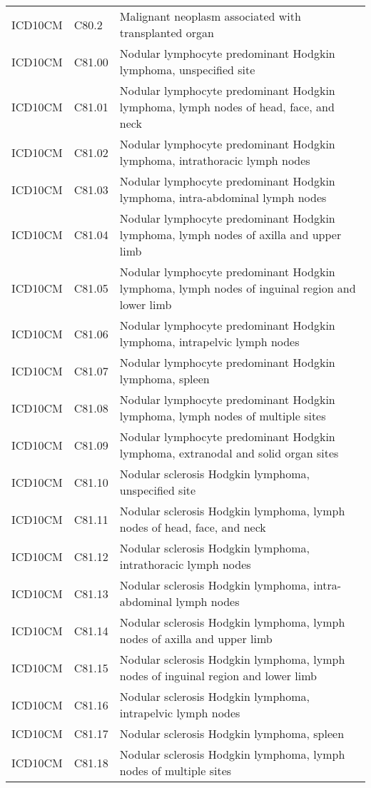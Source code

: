 \begin{longtable}{p{}p{}p{}}
  ICD10CM & C80.2 & Malignant neoplasm associated with transplanted organ \\ 
  ICD10CM & C81.00 & Nodular lymphocyte predominant Hodgkin lymphoma, unspecified site \\ 
  ICD10CM & C81.01 & Nodular lymphocyte predominant Hodgkin lymphoma, lymph nodes of head, face, and neck \\ 
  ICD10CM & C81.02 & Nodular lymphocyte predominant Hodgkin lymphoma, intrathoracic lymph nodes \\ 
  ICD10CM & C81.03 & Nodular lymphocyte predominant Hodgkin lymphoma, intra-abdominal lymph nodes \\ 
  ICD10CM & C81.04 & Nodular lymphocyte predominant Hodgkin lymphoma, lymph nodes of axilla and upper limb \\ 
  ICD10CM & C81.05 & Nodular lymphocyte predominant Hodgkin lymphoma, lymph nodes of inguinal region and lower limb \\ 
  ICD10CM & C81.06 & Nodular lymphocyte predominant Hodgkin lymphoma, intrapelvic lymph nodes \\ 
  ICD10CM & C81.07 & Nodular lymphocyte predominant Hodgkin lymphoma, spleen \\ 
  ICD10CM & C81.08 & Nodular lymphocyte predominant Hodgkin lymphoma, lymph nodes of multiple sites \\ 
  ICD10CM & C81.09 & Nodular lymphocyte predominant Hodgkin lymphoma, extranodal and solid organ sites \\ 
  ICD10CM & C81.10 & Nodular sclerosis Hodgkin lymphoma, unspecified site \\ 
  ICD10CM & C81.11 & Nodular sclerosis Hodgkin lymphoma, lymph nodes of head, face, and neck \\ 
  ICD10CM & C81.12 & Nodular sclerosis Hodgkin lymphoma, intrathoracic lymph nodes \\ 
  ICD10CM & C81.13 & Nodular sclerosis Hodgkin lymphoma, intra-abdominal lymph nodes \\ 
  ICD10CM & C81.14 & Nodular sclerosis Hodgkin lymphoma, lymph nodes of axilla and upper limb \\ 
  ICD10CM & C81.15 & Nodular sclerosis Hodgkin lymphoma, lymph nodes of inguinal region and lower limb \\ 
  ICD10CM & C81.16 & Nodular sclerosis Hodgkin lymphoma, intrapelvic lymph nodes \\ 
  ICD10CM & C81.17 & Nodular sclerosis Hodgkin lymphoma, spleen \\ 
  ICD10CM & C81.18 & Nodular sclerosis Hodgkin lymphoma, lymph nodes of multiple sites \\ 

\end{longtable}
